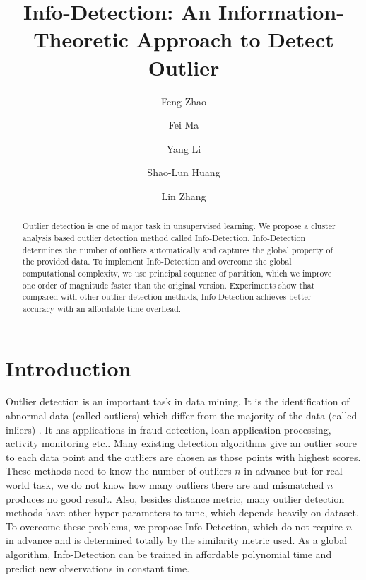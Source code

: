 \documentclass[runningheads]{llncs}
\begin{document}
%
\title{Info-Detection: An Information-Theoretic Approach to Detect Outlier}
%
%
\author{Feng Zhao \and
Fei Ma \and
Yang Li \and
Shao-Lun Huang  \and
Lin Zhang}
%
%
%
\maketitle              %
%
\begin{abstract}
Outlier detection is one of major task in unsupervised learning. We propose a cluster analysis based outlier detection method called Info-Detection. Info-Detection determines the number of outliers automatically and captures the global property of the provided data. To implement Info-Detection and overcome the global computational complexity, we use principal sequence of partition, which we improve one order of magnitude faster than the original version. Experiments show that compared with other outlier detection methods, Info-Detection achieves better accuracy with an affordable time overhead.

\end{abstract}
%
%
%
\section{Introduction}
Outlier detection is an important task in data mining. It is the identification of abnormal data (called outliers) which differ from the majority of the data (called inliers) \cite{grubbs1969procedures}. It has applications in fraud detection, loan application processing, activity monitoring etc.\cite{Hodge2004}. Many existing detection algorithms give an outlier score to each data point and the outliers are chosen as those points with highest scores. These methods need to know the number of outliers $n$ in advance but for real-world task, we do not know how many outliers there are and mismatched $n$ produces no good result. Also, besides distance metric, many outlier detection methods have other hyper parameters to tune, which depends heavily on dataset. To overcome these problems, we propose Info-Detection, which do not require $n$ in advance and is determined totally by the similarity metric used. As a global algorithm, Info-Detection can be trained in affordable polynomial time and predict new observations in constant time.
 
\end{document}
